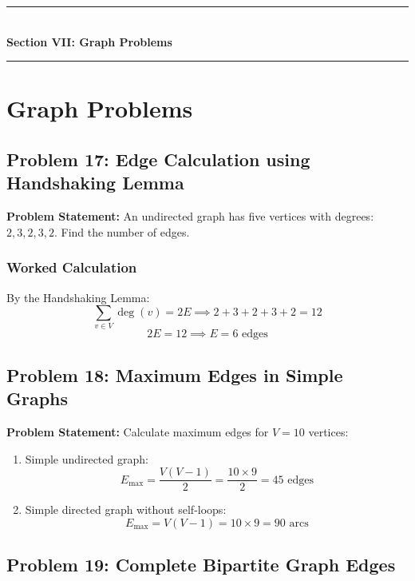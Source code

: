 \newpage
\begin{center}
\vspace{0.5em}
{\color{primary}\rule{0.45\textwidth}{1.2pt}}\\[4pt]
{\Large\bfseries\color{primary} Section VII: Graph Problems}\\[2pt]
{\color{primary}\rule{0.45\textwidth}{1.2pt}}
\vspace{0.5em}
\end{center}

\section{Graph Problems}

\subsection{Problem 17: Edge Calculation using Handshaking Lemma}

\textbf{Problem Statement:} An undirected graph has five vertices with degrees: $2, 3, 2, 3, 2$. Find the number of edges.

\subsubsection*{Worked Calculation}
By the Handshaking Lemma:
\[
\sum_{v \in V} \deg(v) = 2E \implies 2 + 3 + 2 + 3 + 2 = 12
\]
\[
2E = 12 \implies \boxed{E = 6 \text{ edges}}
\]

\subsection{Problem 18: Maximum Edges in Simple Graphs}

\textbf{Problem Statement:} Calculate maximum edges for $V = 10$ vertices:
\begin{enumerate}
    \item Simple undirected graph:
    \[
    E_{\max} = \frac{V(V-1)}{2} = \frac{10 \times 9}{2} = \boxed{45 \text{ edges}}
    \]
    \item Simple directed graph without self-loops:
    \[
    E_{\max} = V(V-1) = 10 \times 9 = \boxed{90 \text{ arcs}}
    \]
\end{enumerate}

\subsection{Problem 19: Complete Bipartite Graph Edges}

